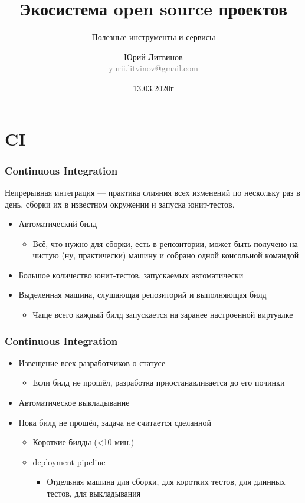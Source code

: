 \documentclass[xetex,mathserif,serif]{beamer}
\title{Экосистема open source проектов}
\subtitle{Полезные инструменты и сервисы}
\author[Юрий Литвинов]{Юрий Литвинов\\\small{\textcolor{gray}{yurii.litvinov@gmail.com}}}
\date{13.03.2020г}
\begin{document}
	\frame{\titlepage}

	\section{CI}

	\begin{frame}
		\frametitle{Continuous Integration}
		Непрерывная интеграция --- практика слияния всех изменений по нескольку раз в день, сборки их в известном окружении и запуска юнит-тестов.
		\begin{itemize}
			\item Автоматический билд
			\begin{itemize}
				\item Всё, что нужно для сборки, есть в репозитории, может быть получено на чистую (ну, практически) машину и собрано одной консольной командой
			\end{itemize}
			\item Большое количество юнит-тестов, запускаемых автоматически
			\item Выделенная машина, слушающая репозиторий и выполняющая билд
			\begin{itemize}
				\item Чаще всего каждый билд запускается на заранее настроенной виртуалке
			\end{itemize}
		\end{itemize}
	\end{frame}

	\begin{frame}
		\frametitle{Continuous Integration}
		\begin{itemize}
			\item Извещение всех разработчиков о статусе
			\begin{itemize}
				\item Если билд не прошёл, разработка приостанавливается до его починки
			\end{itemize}
			\item Автоматическое выкладывание
			\item Пока билд не прошёл, задача не считается сделанной
			\begin{itemize}
				\item Короткие билды (<10 мин.)
				\item deployment pipeline
				\begin{itemize}
					\item Отдельная машина для сборки, для коротких тестов, для длинных тестов, для выкладывания
				\end{itemize}
			\end{itemize}
		\end{itemize}
	\end{frame}
\end{document}
